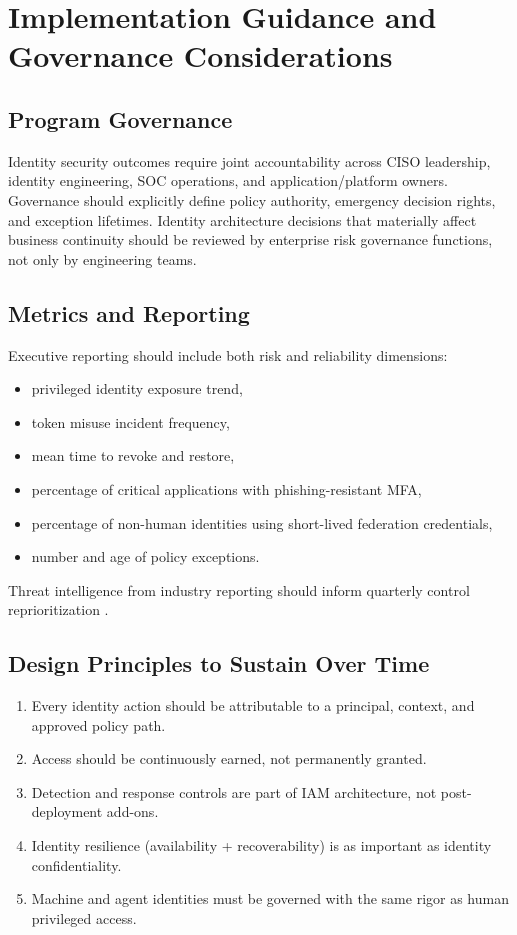 \documentclass[11pt]{article}
\begin{document}
\section{Implementation Guidance and Governance Considerations}
\subsection{Program Governance}
Identity security outcomes require joint accountability across CISO leadership, identity engineering, SOC operations, and application/platform owners. Governance should explicitly define policy authority, emergency decision rights, and exception lifetimes. Identity architecture decisions that materially affect business continuity should be reviewed by enterprise risk governance functions, not only by engineering teams.

\subsection{Metrics and Reporting}
Executive reporting should include both risk and reliability dimensions:
\begin{itemize}[leftmargin=1.5em]
    \item privileged identity exposure trend,
    \item token misuse incident frequency,
    \item mean time to revoke and restore,
    \item percentage of critical applications with phishing-resistant MFA,
    \item percentage of non-human identities using short-lived federation credentials,
    \item number and age of policy exceptions.
\end{itemize}
Threat intelligence from industry reporting should inform quarterly control reprioritization \cite{verizon_dbir,crowdstrike_global_threat}.

\subsection{Design Principles to Sustain Over Time}
\begin{enumerate}[leftmargin=1.5em]
    \item Every identity action should be attributable to a principal, context, and approved policy path.
    \item Access should be continuously earned, not permanently granted.
    \item Detection and response controls are part of IAM architecture, not post-deployment add-ons.
    \item Identity resilience (availability + recoverability) is as important as identity confidentiality.
    \item Machine and agent identities must be governed with the same rigor as human privileged access.
\end{enumerate}
\end{document}
